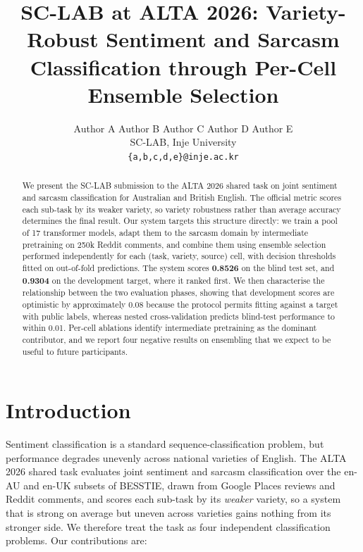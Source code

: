 \documentclass[11pt]{article}
\title{SC-LAB at ALTA 2026: Variety-Robust Sentiment and Sarcasm\\
Classification through Per-Cell Ensemble Selection}
\author{
  Author A \quad Author B \quad Author C \quad Author D \quad Author E \\
  SC-LAB, Inje University \\
  \texttt{\{a,b,c,d,e\}@inje.ac.kr}
}
\begin{document}
\maketitle

\begin{abstract}
We present the SC-LAB submission to the ALTA 2026 shared task on joint
sentiment and sarcasm classification for Australian and British English. The
official metric scores each sub-task by its weaker variety, so variety
robustness rather than average accuracy determines the final result. Our
system targets this structure directly: we train a pool of 17 transformer
models, adapt them to the sarcasm domain by intermediate pretraining on 250k
Reddit comments, and combine them using ensemble selection performed
independently for each (task, variety, source) cell, with decision thresholds
fitted on out-of-fold predictions. The system scores \textbf{0.8526} on the
blind test set, and \textbf{0.9304} on the development target, where it ranked
first. We then characterise the relationship between the two evaluation
phases, showing that development scores are optimistic by approximately 0.08
because the protocol permits fitting against a target with public labels,
whereas nested cross-validation predicts blind-test performance to within
0.01. Per-cell ablations identify intermediate pretraining as the dominant
contributor, and we report four negative results on ensembling that we expect
to be useful to future participants.
\end{abstract}

\section{Introduction}

Sentiment classification is a standard sequence-classification problem, but
performance degrades unevenly across national varieties of English. The ALTA
2026 shared task evaluates joint sentiment and sarcasm classification over the
en-AU and en-UK subsets of BESSTIE, drawn from Google Places reviews and
Reddit comments, and scores each sub-task by its \emph{weaker} variety, so a
system that is strong on average but uneven across varieties gains nothing
from its stronger side. We therefore treat the task as four independent
classification problems. Our contributions are:
\end{document}
